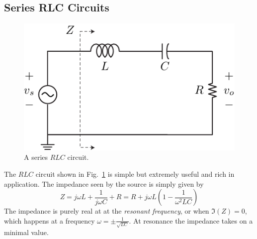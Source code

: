 \subsection{Series RLC Circuits} \label{sec:lcr}
\begin{figure}
\centering
\includegraphics[scale=1]{rlc}
\caption{A series $RLC$ circuit.}
\label{fig:rlc}
\end{figure}
The $RLC$ circuit shown in Fig.~\ref{fig:rlc} is simple but extremely useful and rich in application.  The impedance seen by the source is simply given by
    \begin{equation}
        Z = j\omega L + \frac{1}{j\omega C} + R 
          = R + j\omega L \left( 1 - \frac{1}{\omega^2 LC}\right) 
    \end{equation}
The impedance is purely real at at the \emph{resonant frequency}, or
when $\Im(Z) = 0$, which happens at a frequency $\omega = \pm \frac{1}{\sqrt{L C}}$.  At resonance the impedance takes on a minimal value.  
